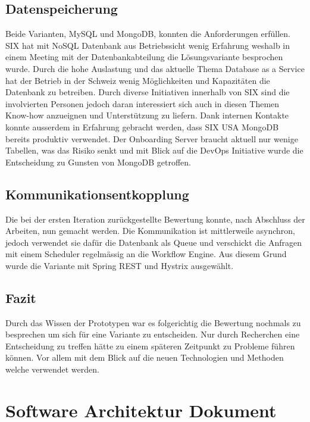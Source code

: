 \subsection{Datenspeicherung}

Beide Varianten, MySQL und MongoDB, konnten die Anforderungen erfüllen. SIX hat mit NoSQL Datenbank aus Betriebssicht wenig Erfahrung weshalb in einem Meeting mit der Datenbankabteilung die Lösungsvariante besprochen wurde. Durch die hohe Auslastung und das aktuelle Thema Database as a Service hat der Betrieb in der Schweiz wenig Möglichkeiten und Kapazitäten die Datenbank zu betreiben. Durch diverse Initiativen innerhalb von SIX sind die involvierten Personen jedoch daran interessiert sich auch in diesen Themen Know-how anzueignen und Unterstützung zu liefern. Dank internen Kontakte konnte ausserdem in Erfahrung gebracht werden, dass SIX USA MongoDB bereits produktiv verwendet. Der Onboarding Server braucht aktuell nur wenige Tabellen, was das Risiko senkt und mit Blick auf die DevOps Initiative wurde die Entscheidung zu Gunsten von MongoDB getroffen.

\subsection{Kommunikationsentkopplung}

Die bei der ersten Iteration zurückgestellte Bewertung konnte, nach Abschluss der Arbeiten, nun gemacht werden. Die Kommunikation ist mittlerweile asynchron, jedoch verwendet sie dafür die Datenbank als Queue und verschickt die Anfragen mit einem Scheduler regelmässig an die Workflow Engine. Aus diesem Grund wurde die Variante mit Spring REST und Hystrix ausgewählt.

\subsection{Fazit}

Durch das Wissen der Prototypen war es folgerichtig die Bewertung nochmals zu besprechen um sich für eine Variante zu entscheiden. Nur durch Recherchen eine Entscheidung zu treffen hätte zu einem späteren Zeitpunkt zu Probleme führen können. Vor allem mit dem Blick auf die neuen Technologien und Methoden welche verwendet werden.

\section{Software Architektur Dokument}

